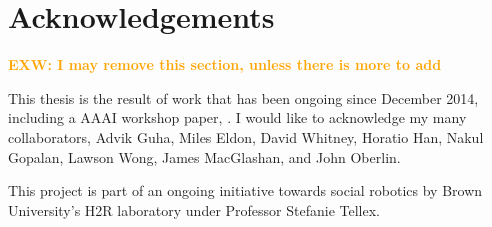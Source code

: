 \documentclass[conference]{IEEEtran}
\newcommand{\exwnote}[1]{\textcolor{orange}{\textbf{EXW: #1}}}
\begin{document}
\section{Acknowledgements}

\exwnote{I may remove this section, unless there is more to add}

This thesis is the result of work that has been ongoing since December 2014, including a AAAI workshop paper, \cite{socialfeedback}.  I would like to acknowledge my many collaborators, Advik Guha, Miles Eldon, David Whitney, Horatio Han, Nakul Gopalan, Lawson Wong, James MacGlashan, and John Oberlin. 

This project is part of an ongoing initiative towards social robotics by Brown University's H2R laboratory under Professor Stefanie Tellex. 



\newpage



\end{document}
